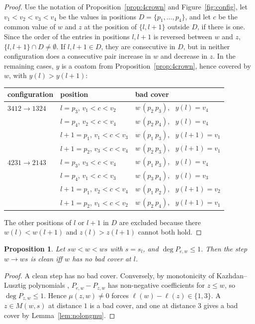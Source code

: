\documentclass[11pt]{amsart}
\newtheorem{proposition}[theorem]{Proposition}
\theoremstyle{definition}
\theoremstyle{remark}
\begin{document}
\begin{proof}
Use the notation of Proposition~\ref{prop:4crown} and Figure~\ref{fig:config}, let $v_1<v_2<v_3<v_4$ be the values in positions $D=\{p_1,\dots,p_4\}$, and let $c$ be the common value of $w$ and $z$ at the position of $\{l,l+1\}$ outside $D$, if there is one. Since the order of the entries in positions $l,l+1$ is reversed between $w$ and $z$, $\{l,l+1\}\cap D\ne\emptyset$. If $l,l+1\in D$, they are consecutive in $D$, but in neither configuration does a consecutive pair increase in $w$ and decrease in $z$. In the remaining cases, $y$ is a coatom from Proposition~\ref{prop:4crown}, hence covered by $w$, with $y(l)>y(l+1)$:
\begin{center}
\begin{tabular}{lll}
\toprule
configuration & position & bad cover \\
\midrule
$3412\to1324$ & $l=p_3$, $v_1<c<v_2$ & $w\,(p_2\ p_3)$, \ $y(l)=v_4$\\
 & $l=p_4$, $v_2<c<v_4$ & $w\,(p_2\ p_4)$, \ $y(l)=v_4$\\
 & $l+1=p_1$, $v_1<c<v_3$ & $w\,(p_1\ p_3)$, \ $y(l+1)=v_1$\\
 & $l+1=p_2$, $v_3<c<v_4$ & $w\,(p_2\ p_3)$, \ $y(l+1)=v_1$\\
$4231\to2143$ & $l=p_3$, $v_3<c<v_4$ & $w\,(p_1\ p_3)$, \ $y(l)=v_4$\\
 & $l=p_4$, $v_1<c<v_3$ & $w\,(p_3\ p_4)$, \ $y(l)=v_3$\\
 & $l+1=p_1$, $v_2<c<v_4$ & $w\,(p_1\ p_2)$, \ $y(l+1)=v_2$\\
 & $l+1=p_2$, $v_1<c<v_2$ & $w\,(p_2\ p_4)$, \ $y(l+1)=v_1$\\
\bottomrule
\end{tabular}
\end{center}
The other positions of $l$ or $l+1$ in $D$ are excluded because there $w(l)<w(l+1)$ and $z(l)>z(l+1)$ cannot both hold.
\end{proof}

\begin{proposition}\label{prop:cleancrit}
Let $sw<w<ws$ with $s=s_l$, and $\deg P_{e,w}\le1$. Then the step $w\to ws$ is clean iff $w$ has no bad cover at $l$.
\end{proposition}

\begin{proof}
A clean step has no bad cover. Conversely, by monotonicity of Kazhdan--Lusztig polynomials \cite[Cor.~3.7]{BM01}, $P_{e,w}-P_{z,w}$ has non-negative coefficients for $z\le w$, so $\deg P_{z,w}\le1$. Hence $\mu(z,w)\ne0$ forces $\ell(w)-\ell(z)\in\{1,3\}$. A $z\in M(w,s)$ at distance $1$ is a bad cover, and one at distance $3$ gives a bad cover by Lemma~\ref{lem:nolongmu}.
\end{proof}
\end{document}
